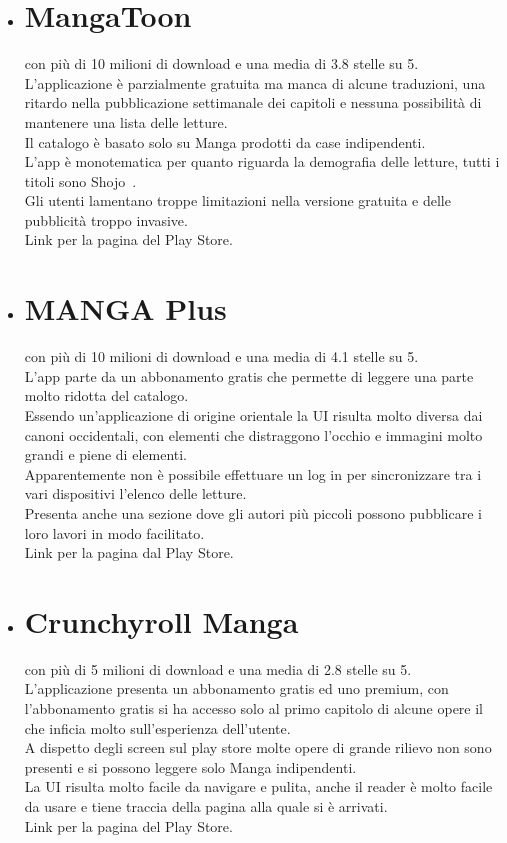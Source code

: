 \documentclass{report}
\begin{document}
\begin{itemize}
	\item
	      \section{MangaToon} con più di 10 milioni di download e una media di 3.8 stelle su 5.\\
	      L'applicazione è parzialmente gratuita ma manca di alcune traduzioni, una ritardo nella pubblicazione settimanale dei capitoli e nessuna possibilità di mantenere una lista delle letture.\\
	      Il catalogo è basato solo su Manga prodotti da case indipendenti.\\
	      L'app è monotematica per quanto riguarda la demografia delle letture, tutti i titoli sono Shojo~\cite{shooManga}.\\
	      Gli utenti lamentano troppe limitazioni nella versione gratuita e delle pubblicità troppo invasive.\\
	      Link per la pagina del Play Store.
	\item
	      \section{MANGA Plus}con più di 10 milioni di download e una media di 4.1 stelle su 5.\\
	      L'app parte da un abbonamento gratis che permette di leggere una parte molto ridotta del catalogo.\\
	      Essendo un'applicazione di origine orientale la UI risulta molto diversa dai canoni occidentali, con elementi che distraggono l'occhio e immagini molto grandi e piene di elementi.\\
	      Apparentemente non è possibile effettuare un log in per sincronizzare tra i vari dispositivi l'elenco delle letture.\\
	      Presenta anche una sezione dove gli autori più piccoli possono pubblicare i loro lavori in modo facilitato.\\
	      Link per la pagina dal Play Store.
	\item
	      \section{Crunchyroll Manga} con più di 5 milioni di download e una media di 2.8 stelle su 5.\\
	      L'applicazione presenta un abbonamento gratis ed uno premium, con l'abbonamento gratis si ha accesso solo al primo capitolo di alcune opere il che inficia molto sull'esperienza dell'utente.\\
	      A dispetto degli screen sul play store molte opere di grande rilievo non sono presenti e si possono leggere solo Manga indipendenti.\\
	      La UI risulta molto facile da navigare e pulita, anche il reader è molto facile da usare e tiene traccia della pagina alla quale si è arrivati.\\
	      Link per la pagina del Play Store.
\end{itemize}
\end{document}
